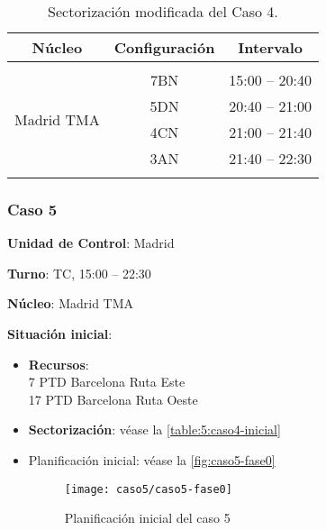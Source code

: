 \begin{table}[h]
	\centering
	\caption{Sectorización modificada del Caso 4.}
	\label{table:D:caso4-modif}
	\begin{tabular}{lcl}
		\hline
		\multicolumn{1}{c}{\textbf{Núcleo}}              & \textbf{Configuración} & \multicolumn{1}{c}{\textbf{Intervalo}} \\ \hline
		& \multicolumn{1}{l}{}   &                                        \\
		\multicolumn{1}{l|}{\multirow{4}{*}{Madrid TMA}} & 7BN                    & 15:00 -- 20:40                         \\
		\multicolumn{1}{l|}{}                            & 5DN                    & 20:40 -- 21:00                         \\
		\multicolumn{1}{l|}{}                            & 4CN                    & 21:00 -- 21:40                         \\
		\multicolumn{1}{l|}{}                            & 3AN                    & 21:40 -- 22:30                         \\
		\multicolumn{1}{c}{}                             &                        & \multicolumn{1}{c}{}                   \\ \hline
	\end{tabular}
\end{table}

\subsubsection{Caso 5}

\textbf{Unidad de Control}: Madrid

\textbf{Turno}: TC, 15:00 -- 22:30

\textbf{Núcleo}: Madrid TMA

\textbf{Situación inicial}:
\begin{itemize}[label={}]
	
	\item \textbf{Recursos}: \\
	7 PTD Barcelona Ruta Este \\
	17 PTD Barcelona Ruta Oeste
	
	
	\item \textbf{Sectorización}: véase la \autoref{table:5:caso4-inicial}
	
	\item Planificación inicial: véase la \autoref{fig:caso5-fase0}

	\begin{figure}[!h]
		\centering
		\texttt{[image: caso5/caso5-fase0]}
		\caption{Planificación inicial del caso 5}
		\label{fig:caso5-fase0}
	\end{figure}

\end{itemize}


